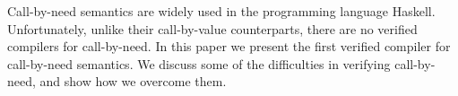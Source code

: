 Call-by-need semantics are widely used in the programming language Haskell.
Unfortunately, unlike their call-by-value counterparts, there are no verified
compilers for call-by-need. In this paper we present the first verified compiler
for call-by-need semantics. We discuss some of the difficulties in verifying
call-by-need, and show how we overcome them. 
